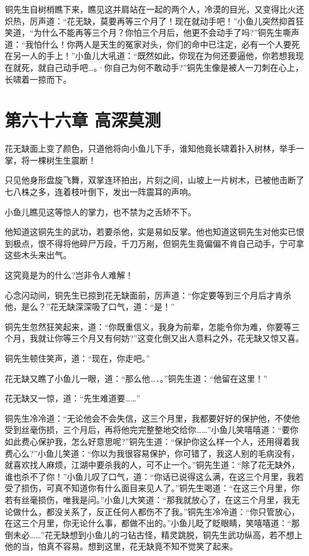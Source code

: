 \documentclass[12pt,oneside]{book}
\begin{document}
铜先生自树梢瞧下来，瞧见这并肩站在一起的两个人，冷漠的目光，又变得比火还炽热，厉声道：``花无缺，莫要再等三个月了！现在就动手吧！''小鱼儿突然抑首狂笑道，``为什么不能再等三个月？你怕三个月后，他更不会动手了吗?''铜先生嘶声道：``我怕什么！你两人是天生的冤家对头，你们的命中已注定，必有一个人要死在另一人的手上！''小鱼儿大吼道：``既然如此，你现在为何还要逼他，你若想我现在就死，就自己动手吧\ldots。·你自己为何不敢动手?''铜先生像是被人一刀刺在心上，长啸着一掠而下。

\hypertarget{ux7b2cux516dux5341ux516dux7ae0-ux9ad8ux6df1ux83abux6d4b}{%
\chapter{第六十六章
高深莫测}\label{ux7b2cux516dux5341ux516dux7ae0-ux9ad8ux6df1ux83abux6d4b}}

花无缺面上变了颜色，只道他将向小鱼儿下手，谁知他竟长啸着扑入树林，举手一掌，将一棵树生生震断！

只见他身形盘旋飞舞，双掌连环拍出，片刻之间，山坡上一片树木，已被他击断了七八株之多，连着枝叶倒下，发出一阵震耳的声响。

小鱼儿瞧见这等惊人的掌力，也不禁为之舌矫不下。

他知道这铜先生的武功，若要杀他，实是易如反掌。他也知道这铜先生对他实已恨到极点，恨不得将他碎尸万段，千刀万剐，但铜先生竟偏偏不肯自己动手，宁可拿这些木头来出气。

这究竟是为的什么?岂非令人难解！

心念闪动间，铜先生已掠到花无缺面前，厉声道：``你定要等到三个月后才肯杀他，是么？''花无缺深深吸了口气，道：``是！''

铜先生忽然狂笑起来，道：``你既重信义，我身为前辈，怎能令你为难，你要等三个月，我就让你等三个月又有何妨?''这变化倒又出人意料之外，花无缺又惊又喜。

铜先生顿住笑声，道：``现在，你走吧。''

花无缺又瞧了小鱼儿一眼，道：``那么他\ldots．。''铜先生道：``他留在这里！''

花无缺又一惊，道：``先生难道要\ldots\ldots{}''

铜先生冷冷道：``无论他会不会失信，这三个月里，我都要好好的保护他，不使他受到丝毫伤损，三个月后，再将他完完整整地交给你\ldots\ldots{}''小鱼儿笑嘻嘻道：``要你如此费心保护我，怎么好意思呢?''铜先生道：``保护你这么样一个人，还用得着我费心么?''小鱼儿笑道：``你以为我很容易保护，你可错了，我这人别的毛病没有，就喜欢找人麻烦，江湖中要杀我的人，可不止一个。''铜先生道：``除了花无缺外，谁也杀不了你！''小鱼儿叹了口气，道：``你话已说得这么满，在这三个月里，我若受了损伤，可真不知道你有什么面目来见人了。''铜先生喝道：``在这三个月里，你若有丝毫损伤，唯我是问。''小鱼儿大笑道：``那我就放心了，在这三个月里，我无论做什么，都没关系了，反正任何人都伤不了我。''铜先生冷冷道：``你只管放心，在这三个月里，你无论什么事，都做不出的。''小鱼儿眨了眨眼睛，笑嘻嘻道：``那倒未必\ldots\ldots{}''花无缺想到小鱼儿的刁钻古怪，精灵跳脱，铜先生武功纵高，若不想上他的当，怕真不容易。想到这里，花无缺竟不知不觉笑了起来。
\end{document}
